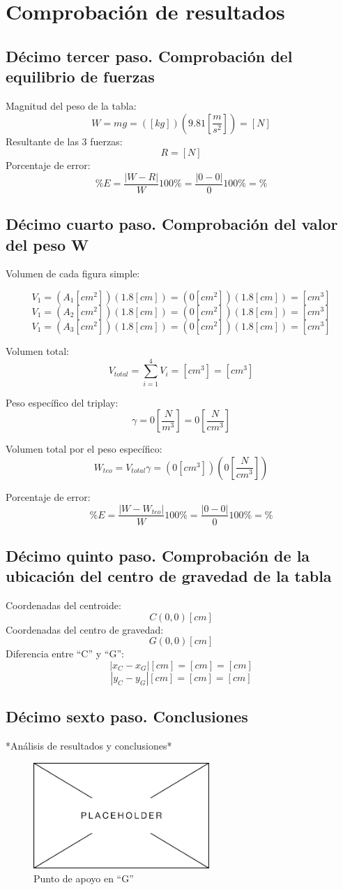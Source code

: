 \documentclass[12pt, titlepage]{report}
\begin{document}
    \hfill
    \section{Comprobación de resultados}
    \subsection*{Décimo tercer paso. Comprobación del equilibrio de fuerzas}
    Magnitud del peso de la tabla: $$W=mg=( [kg])(9.81 [\frac{m}{s^2}]) = [N]$$
    Resultante de las 3 fuerzas: $$R = [N]$$
    Porcentaje de error: $$\%E=\frac{|W-R|}{W}100\%=\frac{|0-0|}{0}100\% = \%$$

    \subsection*{Décimo cuarto paso. Comprobación del valor del peso W}
    Volumen de cada figura simple:
    
    $$V_{1} = (A_{1} [cm^2])(1.8 [cm]) = (0 [cm^2])(1.8 [cm]) = [cm^3]$$
    $$V_{1} = (A_{2} [cm^2])(1.8 [cm]) = (0 [cm^2])(1.8 [cm]) = [cm^3]$$
    $$V_{1} = (A_{3} [cm^2])(1.8 [cm]) = (0 [cm^2])(1.8 [cm]) = [cm^3]$$

    Volumen total: $$V_{total}=\sum_{i = 1}^{4} V_{i} = [cm^3] = [cm^3]$$

    Peso específico del triplay: $$\gamma =0 [\frac{N}{m^3}] = 0 [\frac{N}{cm^3}]$$

    Volumen total por el peso específico: $$W_{teo}=V_{total}\gamma = (0[cm^3])(0[\frac{N}{cm^3}])$$

    Porcentaje de error: $$\%E=\frac{|W-W_{teo}|}{W}100\%=\frac{|0-0|}{0}100\% = \%$$

    \subsection*{Décimo quinto paso. Comprobación de la ubicación del centro de gravedad de la tabla}
    Coordenadas del centroide: $$C(0, 0)[cm]$$
    Coordenadas del centro de gravedad: $$G(0, 0)[cm]$$ 
    Diferencia entre ``C'' y ``G'': 
    $$|x_{C}-x_{G}| [cm] = [cm] = [cm]$$
    $$|y_{C}-y_{G}| [cm] = [cm] = [cm]$$

    \subsection*{Décimo sexto paso. Conclusiones}
    *Análisis de resultados y conclusiones*
    
    \begin{figure}[ht]
        \centering
        \includegraphics[height=4cm]{Placeholder.png}
        \caption{Punto de apoyo en ``G''}
    \end{figure}
\end{document}
